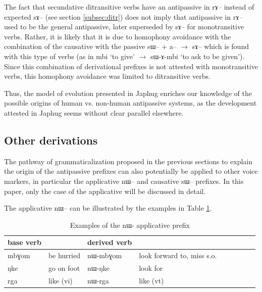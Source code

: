 \documentclass[oldfontcommands,oneside,a4paper,11pt]{article}
\newcommand{\ipa}[1]{{\phon \mbox{#1}}} %
\begin{document}
 The fact that secundative ditransitive verbs have an antipassive in \ipa{rɤ}-- instead of expected \ipa{sɤ}-- (see section \ref{subsec:ditr}) does not imply that antipassive in \ipa{rɤ}-- used to be the general antipassive, later superseded by \ipa{sɤ}-- for monotransitive verbs. Rather, it is likely that it is due to homophony avoidance with the combination of the causative with the passive \ipa{sɯ}-- + \ipa{a}-- $\rightarrow$ \ipa{sɤ}-- which is found with this type of verbs (as in \ipa{mbi} `to give' $\rightarrow$ \ipa{sɯ-ɤ-mbi} `to ask to be given'). Since this combination of derivational prefixes is not attested with monotransitive verbs, this homophony avoidance was limited to ditransitive verbs.



Thus, the model of evolution presented in Japhug enriches our knowledge of the possible origins of human vs. non-human antipassive systems, as the development attested in Japhug seems without clear parallel elsewhere.


%
\subsection{Other derivations} \label{sec:appl}
The pathway of grammaticalization proposed   in the previous sections to explain the origin of the antipassive prefixes can also potentially be applied to other voice markers, in particular the applicative \ipa{nɯ}-- and  causative \ipa{sɯ}-- prefixes. In this paper, only the case of the applicative will be discussed in detail.


The applicative \ipa{nɯ}-- can be illustrated by the examples in Table \ref{tab:applicative}.
\begin{table}[H]
\caption{Examples of the \ipa{nɯ}- applicative prefix}\label{tab:applicative}
\begin{tabular}{lllllllll} \toprule
base  verb  & &derived   verb &\\
\midrule
\ipa{mbɣom}  &	be hurried & \ipa{nɯ-mbɣom}  & look  forward to, miss s.o.\\
\ipa{ŋke}  &go on foot	& \ipa{nɯ-ŋke}  & look for \\
\ipa{rga}  &	like (vi) & \ipa{nɯ-rga}  &like (vt) \\
\bottomrule
\end{tabular}
\end{table}
\end{document}
